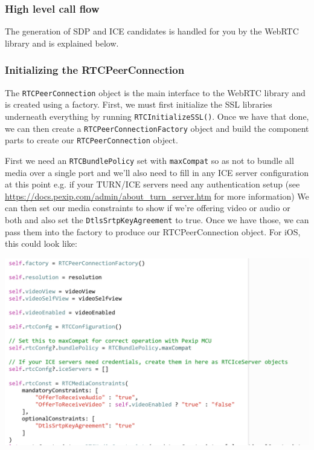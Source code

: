 \documentclass[a4paper,11pt]{article}
\begin{document}
\subsubsection{High level call flow}
\label{sec:org8ca8d36}

The generation of SDP and ICE candidates is handled for you by the
WebRTC library and is explained below.

\subsubsection{Initializing the RTCPeerConnection}
\label{sec:org8d9af48}

The \texttt{RTCPeerConnection} object is the main interface to the WebRTC
library and is created using a factory.  First, we must first
initialize the SSL libraries underneath everything by running
\texttt{RTCInitializeSSL()}. Once we have that done, we can then create a
\texttt{RTCPeerConnectionFactory} object and build the component
parts to create our \texttt{RTCPeerConnection} object.

First we need an \texttt{RTCBundlePolicy} set with \texttt{maxCompat} so as not to
bundle all media over a single port and we'll also need to fill in any
ICE server configuration at this point e.g. if your TURN/ICE servers
need any authentication setup (see
\url{https://docs.pexip.com/admin/about\_turn\_server.htm} for more
information)
We can then set our media constraints to show if we're offering video
or audio or both and also set the \texttt{DtlsSrtpKeyAgreement} to true.
Once we have those, we can pass them into the factory to produce our
RTCPeerConnection object.  For iOS, this could look like:

\begin{center}
\includegraphics[width=.9\linewidth]{./images/peer_connection.png}
\end{center}
\end{document}
